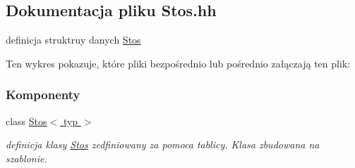 \hypertarget{_stos_8hh}{}\subsection{Dokumentacja pliku Stos.\+hh}
\label{_stos_8hh}


definicja struktruy danych \hyperlink{class_stos}{Stos}  


Ten wykres pokazuje, które pliki bezpośrednio lub pośrednio załączają ten plik\+:
\subsubsection*{Komponenty}
\begin{DoxyCompactItemize}
\item 
class \hyperlink{class_stos}{Stos$<$ typ $>$}
\begin{DoxyCompactList}\small\item\em definicja klasy \hyperlink{class_stos}{Stos} zedfiniowany za pomoca tablicy. Klasa zbudowana na szablonie. \end{DoxyCompactList}\end{DoxyCompactItemize}
